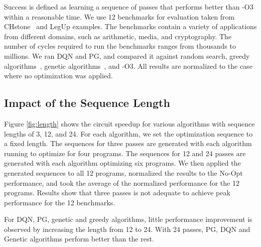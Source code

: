 Success is defined as learning a sequence of passes that performs better than -O3 within a reasonable time. 
We use $12$ benchmarks for evaluation taken from CHstone~\cite{hara2008chstone} and LegUp examples. The benchmarks contain a variety of applications from different domains, such as arithmetic, media, and cryptography. The number of cycles required to run the benchmarks ranges from thousands to millions. We ran DQN and PG, and compared it against random search, greedy algorithms~\cite{huang2013effect}, genetic algorithms~\cite{DEAP_JMLR2012}, and -O3. All results are normalized to the case where no optimization was applied.

\subsection{Impact of the Sequence Length}
Figure \ref{fig:length} shows the circuit speedup for various algorithms with sequence lengths of 3, 12, and 24.  
For each algorithm, we set the optimization sequence to a fixed length.
The sequences for three passes are generated with each algorithm running to optimize for four programs. 
The sequences for 12 and 24 passes are generated with each algorithm optimizing six programs. 
We then applied the generated sequences to all 12 programs, normalized the results to the No-Opt performance, and  
took the average of the normalized performance for the 12 programs. 
Results show that three passes is not adequate to achieve peak performance for the 12 benchmarks. 

For DQN, PG, genetic and greedy algorithms, little performance improvement is observed by increasing the length from 12 to 24. 
With 24 passes, PG, DQN and Genetic algorithms perform better than the rest. 


